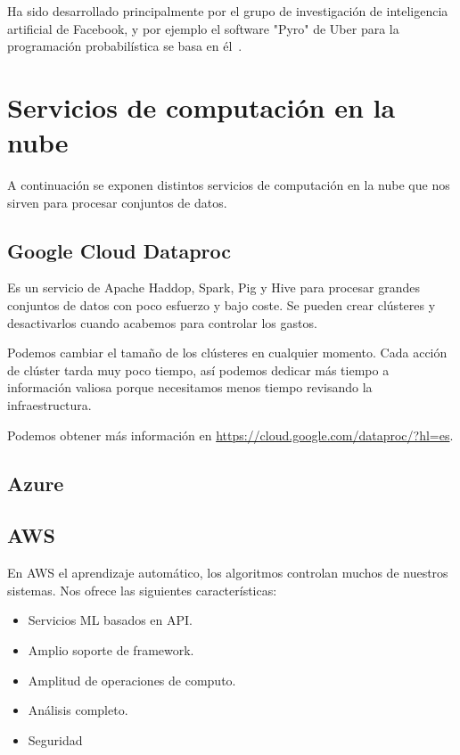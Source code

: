 Ha sido desarrollado principalmente por el grupo de investigación de inteligencia artificial de Facebook, y por ejemplo el software "Pyro" de Uber para la programación probabilística se basa en él~\cite{wiki:pytorch}.

\section{Servicios de computación en la nube}
A continuación se exponen distintos servicios de computación en la nube que nos sirven para procesar conjuntos de datos.

\subsection{Google Cloud Dataproc}
Es un servicio de Apache Haddop, Spark, Pig y Hive para procesar grandes conjuntos de datos con poco esfuerzo y bajo coste. Se pueden crear clústeres y desactivarlos cuando acabemos para  controlar los gastos.

Podemos cambiar el tamaño de los clústeres en cualquier momento. Cada acción de clúster tarda muy poco tiempo, así podemos dedicar más tiempo a información valiosa porque necesitamos menos tiempo revisando la infraestructura.

Podemos obtener más información en \url{https://cloud.google.com/dataproc/?hl=es}.

\subsection{Azure}

\subsection{AWS}
En AWS el aprendizaje automático, los algoritmos controlan muchos de nuestros sistemas. Nos ofrece las siguientes características:
\begin{itemize}
	\item Servicios ML basados en API.
	\item Amplio soporte de framework.
	\item Amplitud de operaciones de computo.
	\item Análisis completo.
	\item Seguridad
\end{itemize}